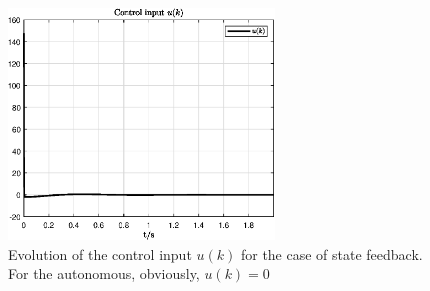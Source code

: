 \documentclass[11pt,a4paper,oneside]{book}
\numberwithin{equation}{section}
\theoremstyle{it}
\theoremstyle{definition}
\begin{document}
\begin{figure}[H]
	\centering
	\includegraphics[width = 200pt, 
	keepaspectratio]{figures/optimal_control/control_input2.eps}
	\captionsetup{width=0.5\textwidth, font=small}
	\caption{Evolution of the control input $u(k)$ for the case of state 
		feedback. For the autonomous, obviously, $u(k)=0$}
	\label{figure_control_input2}
\end{figure}
\end{document}
